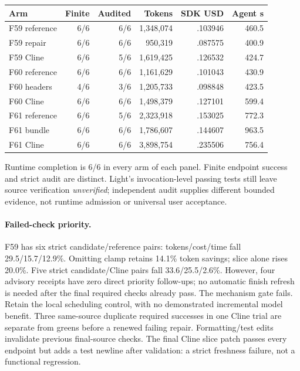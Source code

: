 \documentclass[11pt,a4paper]{article}
\begin{document}
\begin{center}\small\begin{tabular}{lrrrrr}
\toprule Arm & Finite & Audited & Tokens & SDK USD & Agent s \\\midrule
F59 reference & 6/6 & 6/6 & 1,348,074 & .103946 & 460.5 \\
F59 repair & 6/6 & 6/6 & 950,319 & .087575 & 400.9 \\
F59 Cline & 6/6 & 5/6 & 1,619,425 & .126532 & 424.7 \\\midrule
F60 reference & 6/6 & 6/6 & 1,161,629 & .101043 & 430.9 \\
F60 headers & 4/6 & 3/6 & 1,205,733 & .098848 & 423.5 \\
F60 Cline & 6/6 & 6/6 & 1,498,379 & .127101 & 599.4 \\\midrule
F61 reference & 6/6 & 5/6 & 2,323,918 & .153025 & 772.3 \\
F61 bundle & 6/6 & 6/6 & 1,786,607 & .144607 & 963.5 \\
F61 Cline & 6/6 & 6/6 & 3,898,754 & .235506 & 756.4 \\\bottomrule
\end{tabular}\end{center}
Runtime completion is 6/6 in every arm of each panel. Finite endpoint success and
strict audit are distinct. Light's invocation-level passing tests still leave
source verification \emph{unverified}; independent audit supplies different
bounded evidence, not runtime admission or universal user acceptance.

\paragraph{Failed-check priority.}
F59 has six strict candidate/reference pairs: tokens/cost/time fall
29.5/15.7/12.9\%. Omitting clamp retains 14.1\% token savings; slice alone rises
20.0\%. Five strict candidate/Cline pairs fall 33.6/25.5/2.6\%. However, four
advisory receipts have zero direct priority follow-ups; no automatic finish
refresh is needed after the final required checks already pass. The mechanism
gate fails. Retain the local scheduling control, with no demonstrated incremental
model benefit. Three same-source duplicate required successes in one Cline trial
are separate from greens before a renewed failing repair. Formatting/test edits
invalidate previous final-source checks. The final Cline slice patch passes every
endpoint but adds a test newline after validation: a strict freshness failure,
not a functional regression.
\end{document}
